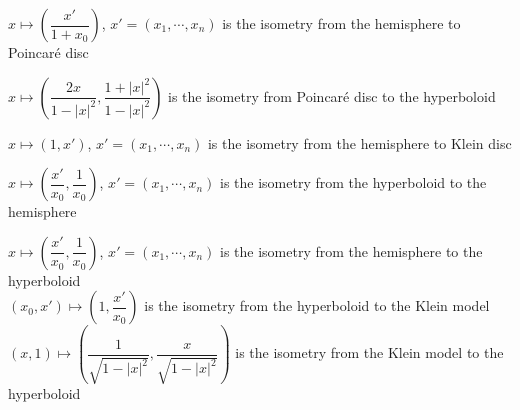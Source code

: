 \documentclass[main]{subfiles}
\begin{document}
\begin{definition}
$x\mapsto\left(\dfrac{x'}{1+x_0}\right)$, $x'=(x_1,\cdots,x_n)$ is the isometry from the hemisphere to Poincar\'e disc \par
$x\mapsto\left(\dfrac{2x}{1-|x|^2},\dfrac{1+|x|^2}{1-|x|^2}\right)$ is the isometry from Poincar\'e disc to the hyperboloid \par
$x\mapsto\left(1,x'\right)$, $x'=(x_1,\cdots,x_n)$ is the isometry from the hemisphere to Klein disc \par
$x\mapsto\left(\dfrac{x'}{x_0},\dfrac{1}{x_0}\right)$, $x'=(x_1,\cdots,x_n)$ is the isometry from the hyperboloid to the hemisphere \par
$x\mapsto\left(\dfrac{x'}{x_0},\dfrac{1}{x_0}\right)$, $x'=(x_1,\cdots,x_n)$ is the isometry from the hemisphere to the hyperboloid \\
$(x_0,x')\mapsto\left(1,\dfrac{x'}{x_0}\right)$ is the isometry from the hyperboloid to the Klein model \\
$(x,1)\mapsto\left(\dfrac{1}{\sqrt{1-|x|^2}},\dfrac{x}{\sqrt{1-|x|^2}}\right)$ is the isometry from the Klein model to the hyperboloid \\



\end{definition}
\end{document}

